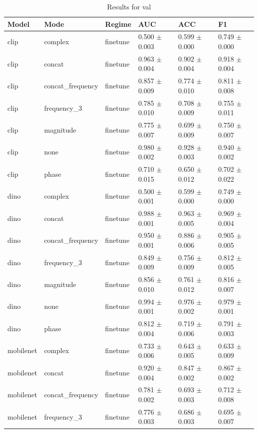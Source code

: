 \begin{table}
\caption{Results for val}
\label{tab:results_val}
\begin{tabular}{llllll}
\toprule
Model & Mode & Regime & AUC & ACC & F1 \\
\midrule
clip & complex & finetune & 0.500 $\pm$ 0.003 & 0.599 $\pm$ 0.000 & 0.749 $\pm$ 0.000 \\
clip & concat & finetune & 0.963 $\pm$ 0.004 & 0.902 $\pm$ 0.004 & 0.918 $\pm$ 0.004 \\
clip & concat_frequency & finetune & 0.857 $\pm$ 0.009 & 0.774 $\pm$ 0.010 & 0.811 $\pm$ 0.008 \\
clip & frequency_3 & finetune & 0.785 $\pm$ 0.010 & 0.708 $\pm$ 0.009 & 0.755 $\pm$ 0.011 \\
clip & magnitude & finetune & 0.775 $\pm$ 0.007 & 0.699 $\pm$ 0.009 & 0.750 $\pm$ 0.007 \\
clip & none & finetune & 0.980 $\pm$ 0.002 & 0.928 $\pm$ 0.003 & 0.940 $\pm$ 0.002 \\
clip & phase & finetune & 0.710 $\pm$ 0.015 & 0.650 $\pm$ 0.012 & 0.702 $\pm$ 0.022 \\
dino & complex & finetune & 0.500 $\pm$ 0.001 & 0.599 $\pm$ 0.000 & 0.749 $\pm$ 0.000 \\
dino & concat & finetune & 0.988 $\pm$ 0.001 & 0.963 $\pm$ 0.005 & 0.969 $\pm$ 0.004 \\
dino & concat_frequency & finetune & 0.950 $\pm$ 0.001 & 0.886 $\pm$ 0.006 & 0.905 $\pm$ 0.005 \\
dino & frequency_3 & finetune & 0.849 $\pm$ 0.009 & 0.756 $\pm$ 0.009 & 0.812 $\pm$ 0.005 \\
dino & magnitude & finetune & 0.856 $\pm$ 0.010 & 0.761 $\pm$ 0.012 & 0.816 $\pm$ 0.007 \\
dino & none & finetune & 0.994 $\pm$ 0.001 & 0.976 $\pm$ 0.002 & 0.979 $\pm$ 0.001 \\
dino & phase & finetune & 0.812 $\pm$ 0.004 & 0.719 $\pm$ 0.006 & 0.791 $\pm$ 0.003 \\
mobilenet & complex & finetune & 0.733 $\pm$ 0.006 & 0.643 $\pm$ 0.005 & 0.633 $\pm$ 0.009 \\
mobilenet & concat & finetune & 0.920 $\pm$ 0.004 & 0.847 $\pm$ 0.002 & 0.867 $\pm$ 0.002 \\
mobilenet & concat_frequency & finetune & 0.781 $\pm$ 0.002 & 0.693 $\pm$ 0.003 & 0.712 $\pm$ 0.008 \\
mobilenet & frequency_3 & finetune & 0.776 $\pm$ 0.003 & 0.686 $\pm$ 0.003 & 0.695 $\pm$ 0.007 \\

\end{tabular}
\end{table}

